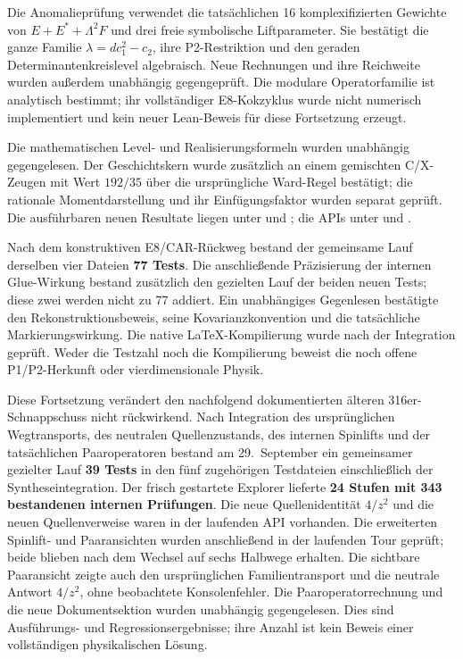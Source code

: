 Die Anomalieprüfung verwendet die tatsächlichen 16 komplexifizierten Gewichte von $E+E^*+\Lambda^2F$ und drei freie symbolische Liftparameter. Sie bestätigt die ganze Familie $\lambda=d c_1^2-c_2$, ihre P2-Restriktion und den geraden Determinantenkreislevel algebraisch. Neue Rechnungen und ihre Reichweite wurden außerdem unabhängig gegengeprüft. Die modulare Operatorfamilie ist analytisch bestimmt; ihr vollständiger E8-Kokzyklus wurde nicht numerisch implementiert und kein neuer Lean-Beweis für diese Fortsetzung erzeugt.

Die mathematischen Level- und Realisierungsformeln wurden unabhängig gegengelesen. Der Geschichtskern wurde zusätzlich an einem gemischten C/X-Zeugen mit Wert $192/35$ über die ursprüngliche Ward-Regel bestätigt; die rationale Momentdarstellung und ihr Einfügungsfaktor wurden separat geprüft. Die ausführbaren neuen Resultate liegen unter  und ; die APIs unter  und .

Nach dem konstruktiven E8/CAR-Rückweg bestand der gemeinsame Lauf derselben vier Dateien \textbf{77 Tests}. Die anschließende Präzisierung der internen Glue-Wirkung bestand zusätzlich den gezielten Lauf der beiden neuen Tests; diese zwei werden nicht zu 77 addiert. Ein unabhängiges Gegenlesen bestätigte den Rekonstruktionsbeweis, seine Kovarianzkonvention und die tatsächliche Markierungswirkung. Die native LaTeX-Kompilierung wurde nach der Integration geprüft. Weder die Testzahl noch die Kompilierung beweist die noch offene P1/P2-Herkunft oder vierdimensionale Physik.

Diese Fortsetzung verändert den nachfolgend dokumentierten älteren 316er-Schnappschuss nicht rückwirkend. Nach Integration des ursprünglichen Wegtransports, des neutralen Quellenzustands, des internen Spinlifts und der tatsächlichen Paaroperatoren bestand am 29.~September ein gemeinsamer gezielter Lauf \textbf{39 Tests} in den fünf zugehörigen Testdateien einschließlich der Syntheseintegration. Der frisch gestartete Explorer lieferte \textbf{24 Stufen mit 343 bestandenen internen Prüfungen}. Die neue Quellenidentität $4/z^2$ und die neuen Quellenverweise waren in der laufenden API vorhanden. Die erweiterten Spinlift- und Paaransichten wurden anschließend in der laufenden Tour geprüft; beide blieben nach dem Wechsel auf sechs Halbwege erhalten. Die sichtbare Paaransicht zeigte auch den ursprünglichen Familientransport und die neutrale Antwort $4/z^2$, ohne beobachtete Konsolenfehler. Die Paaroperatorrechnung und die neue Dokumentsektion wurden unabhängig gegengelesen. Dies sind Ausführungs- und Regressionsergebnisse; ihre Anzahl ist kein Beweis einer vollständigen physikalischen Lösung.

